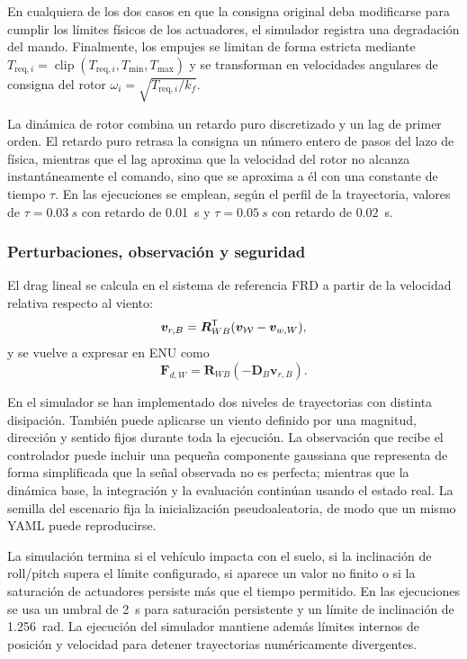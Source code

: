 En cualquiera de los dos casos en que la consigna original deba modificarse para cumplir los límites físicos
de los actuadores, el simulador registra una degradación del mando. Finalmente, los empujes se limitan de
forma estricta mediante $T_{\text{req}, i} = \operatorname{clip}(T_{\text{req}, i}, T_{\min}, T_{\max})$
y se transforman en velocidades angulares de consigna del rotor $\omega_i = \sqrt{T_{\text{req}, i}/k_f}$.

La dinámica de rotor combina un retardo puro discretizado y un lag de primer orden. 
El retardo puro retrasa la consigna un número entero de pasos del lazo de física,
mientras que el lag aproxima que la velocidad del rotor no alcanza instantáneamente
el comando, sino que se aproxima a él con una constante de tiempo $\tau$. 
En las ejecuciones se emplean, según el perfil de la trayectoria, valores de
$\tau=\SI{0.03}{s}$ con retardo de \SI{0.01}{s} y $\tau=\SI{0.05}{s}$ con retardo
de \SI{0.02}{s}.

\subsubsection*{Perturbaciones, observación y seguridad}
\label{subsubsec:perturbaciones-observacion-seguridad}

El drag lineal se calcula en el sistema de referencia FRD a partir de la
velocidad relativa respecto al viento:
\begin{equation}
 \bm{v}_{r,B}=\bm{R}_{WB}^{\mathsf{T}}(\bm{v}_{\mathcal{W}}-\bm{v}_{w,W}),
\end{equation}
y se vuelve a expresar en ENU como
\begin{equation}
 \bm{F}_{d,W}=\bm{R}_{WB}\left(-\bm{D}_B\bm{v}_{r,B}\right).
 \label{eq:drag-lineal}
\end{equation}

En el simulador se han implementado dos niveles de trayectorias con distinta
disipación. También puede aplicarse un viento definido por una magnitud, dirección y
sentido fijos durante toda la ejecución. La observación que recibe el controlador puede
incluir una pequeña componente gaussiana que representa de forma simplificada que la
señal observada no es perfecta; mientras que la dinámica base, la integración y la evaluación continúan usando el estado real. La semilla del escenario fija la
inicialización pseudoaleatoria, de modo que un mismo YAML puede reproducirse.

La simulación termina si el vehículo impacta con el suelo, si la inclinación de
roll/pitch supera el límite configurado, si aparece un valor no finito o si la
saturación de actuadores persiste más que el tiempo permitido. En las ejecuciones se usa un umbral de \SI{2}{s} para saturación persistente y un límite de
inclinación de \SI{1.256}{rad}. La ejecución del simulador mantiene además límites
internos de posición y velocidad para detener trayectorias numéricamente divergentes.

